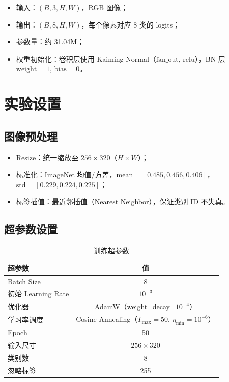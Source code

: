 \documentclass[UTF8,a4paper,12pt,fontset=fandol]{ctexart}
\begin{document}
\begin{itemize}
    \item 输入：$(B, 3, H, W)$，RGB 图像；
    \item 输出：$(B, 8, H, W)$，每个像素对应 8 类的 logits；
    \item 参数量：约 31.04M；
    \item 权重初始化：卷积层使用 Kaiming Normal（$\text{fan\_out}$, $\text{relu}$），BN 层 $\text{weight}=1$, $\text{bias}=0$。
\end{itemize}

\section{实验设置}

\subsection{图像预处理}
\begin{itemize}
    \item Resize：统一缩放至 $256 \times 320$（$H \times W$）；
    \item 标准化：ImageNet 均值/方差，$\text{mean}=[0.485, 0.456, 0.406]$，$\text{std}=[0.229, 0.224, 0.225]$；
    \item 标签插值：最近邻插值（Nearest Neighbor），保证类别 ID 不失真。
\end{itemize}

\subsection{超参数设置}
\begin{table}[H]
\centering
\caption{训练超参数}
\begin{tabular}{lc}
\toprule
超参数 & 值 \\
\midrule
Batch Size & 8 \\
初始 Learning Rate & $10^{-3}$ \\
优化器 & AdamW（weight\_decay=$10^{-4}$） \\
学习率调度 & Cosine Annealing（$T_{\max}=50$, $\eta_{\min}=10^{-6}$） \\
Epoch & 50 \\
输入尺寸 & $256 \times 320$ \\
类别数 & 8 \\
忽略标签 & 255 \\
\bottomrule
\end{tabular}
\end{table}
\end{document}
